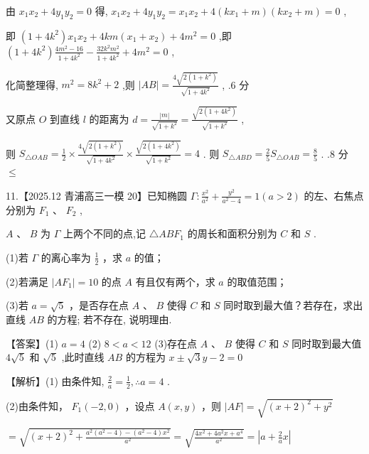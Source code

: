 \documentclass[10pt]{article}
\begin{document}
由 \({x}_{1}{x}_{2} + 4{y}_{1}{y}_{2} = 0\) 得, \({x}_{1}{x}_{2} + 4{y}_{1}{y}_{2} = {x}_{1}{x}_{2} + 4\left( {k{x}_{1} + m}\right) \left( {k{x}_{2} + m}\right)  = 0\) ,

即 \(\left( {1 + 4{k}^{2}}\right) {x}_{1}{x}_{2} + {4km}\left( {{x}_{1} + {x}_{2}}\right)  + 4{m}^{2} = 0\) ,即 \(\left( {1 + 4{k}^{2}}\right) \frac{4{m}^{2} - {16}}{1 + 4{k}^{2}} - \frac{{32}{k}^{2}{m}^{2}}{1 + 4{k}^{2}} + 4{m}^{2} = 0\) ,

化简整理得, \({m}^{2} = 8{k}^{2} + 2\) ,则 \(\left| {AB}\right|  = \frac{4\sqrt{2\left( {1 + {k}^{2}}\right) }}{\sqrt{1 + 4{k}^{2}}}\) , .6 分

又原点 \(O\) 到直线 \(l\) 的距离为 \(d = \frac{\left| m\right| }{\sqrt{1 + {k}^{2}}} = \frac{\sqrt{2\left( {1 + 4{k}^{2}}\right) }}{\sqrt{1 + {k}^{2}}}\) ,

则 \({S}_{\bigtriangleup {OAB}} = \frac{1}{2} \times  \frac{4\sqrt{2\left( {1 + {k}^{2}}\right) }}{\sqrt{1 + 4{k}^{2}}} \times  \frac{\sqrt{2\left( {1 + 4{k}^{2}}\right) }}{\sqrt{1 + {k}^{2}}} = 4\) . 则 \({S}_{\bigtriangleup {ABD}} = \frac{2}{5}{S}_{\bigtriangleup {OAB}} = \frac{8}{5}\) . .8 分 \(\leq\)

11.【2025.12 青浦高三一模 20】已知椭圆 \(\Gamma  : \frac{{x}^{2}}{{a}^{2}} + \frac{{y}^{2}}{{a}^{2} - 4} = 1\left( {a > 2}\right)\) 的左、右焦点分别为 \({F}_{1}\text{ 、 }{F}_{2}\) ,

\(A\text{ 、 }B\) 为 \(\Gamma\) 上两个不同的点,记 \(\bigtriangleup {AB}{F}_{1}\) 的周长和面积分别为 \(C\) 和 \(S\) .

(1)若 \(\Gamma\) 的离心率为 \(\frac{1}{2}\) ，求 \(a\) 的值；

(2)若满足 \(\left| {A{F}_{1}}\right|  = {10}\) 的点 \(A\) 有且仅有两个，求 \(a\) 的取值范围；

(3)若 \(a = \sqrt{5}\) ，是否存在点 \(A\) 、 \(B\) 使得 \(C\) 和 \(S\) 同时取到最大值？若存在，求出直线 \({AB}\) 的方程; 若不存在, 说明理由.

【答案】(1) \(a = 4\) (2) \(8 < a < {12}\) (3)存在点 \(A\text{ 、 }B\) 使得 \(C\) 和 \(S\) 同时取到最大值 \(4\sqrt{5}\) 和 \(\sqrt{5}\) ,此时直线 \({AB}\) 的方程为 \(x \pm  \sqrt{3}y - 2 = 0\)

【解析】(1) 由条件知, \(\frac{2}{a} = \frac{1}{2},\therefore a = 4\) .

(2)由条件知， \({F}_{1}\left( {-2,0}\right)\) ，设点 \(A\left( {x,y}\right)\) ，则 \(\left| {AF}\right|  = \sqrt{{\left( x + 2\right) }^{2} + {y}^{2}}\)

\(= \sqrt{{\left( x + 2\right) }^{2} + \frac{{a}^{2}\left( {{a}^{2} - 4}\right)  - \left( {{a}^{2} - 4}\right) {x}^{2}}{{a}^{2}}} = \sqrt{\frac{4{x}^{2} + 4{a}^{2}x + {a}^{4}}{{a}^{2}}} = \left| {a + \frac{2}{a}x}\right|\)
\end{document}
